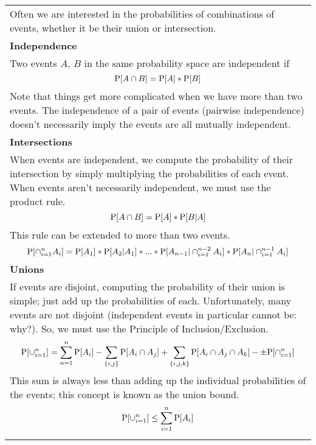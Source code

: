 {\tabulinesep=1mm
\begin{tabu}{|p{16cm} |}
\hline
Often we are interested in the probabilities of combinations of events, whether it be their union or intersection. \\ 
\vspace{2mm}
\textbf{Independence} \\
Two events $A$, $B$ in the same probability space are independent if 
\[\P[A \cap B] = \P[A] * \P[B] \]
Note that things get more complicated when we have more than two events. The independence of a pair of events (pairwise independence) doesn't necessarily imply the events are all mutually independent. \\
\vspace{2mm}
\textbf{Intersections} \\
When events are independent, we compute the probability of their intersection by simply multiplying the probabilities of each event. When events aren't necessarily independent, we must use the product rule. 
\[\P[A \cap B] = \P[A] * \P[B|A] \]
This rule can be extended to more than two events.
\[\P[\cap^{n}_{i=1}A_i] = \P[A_1] * \P[A_2|A_1] * ... * \P[A_{n-1}|\cap^{n-2}_{i=1}A_i] *  \P[A_{n}|\cap^{n-1}_{i=1}A_i]  \]
\vspace{2mm}
\textbf{Unions}\\
If events are disjoint, computing the probability of their union is simple; just add up the probabilities of each. Unfortunately, many events are not disjoint (independent events in particular cannot be: why?). So, we must use the Principle of Inclusion/Exclusion.
\[\P[\cup^{n}_{i=1}] = \sum_{n=1}^{n} \P[A_i] - \sum_{\{i, j\}} \P[A_i \cap A_j] + \sum_{\{i, j, k\}} \P[A_i \cap A_j \cap A_k] - \pm \P[\cap^{n}_{i=1}] \]
This sum is always less than adding up the individual probabilities of the events; this concept is known as the union bound. 
\[\P[\cup^{n}_{i=1}] \leq \sum^{n}_{i=1} \P[A_i] \]
\\
\hline
\end{tabu}
}